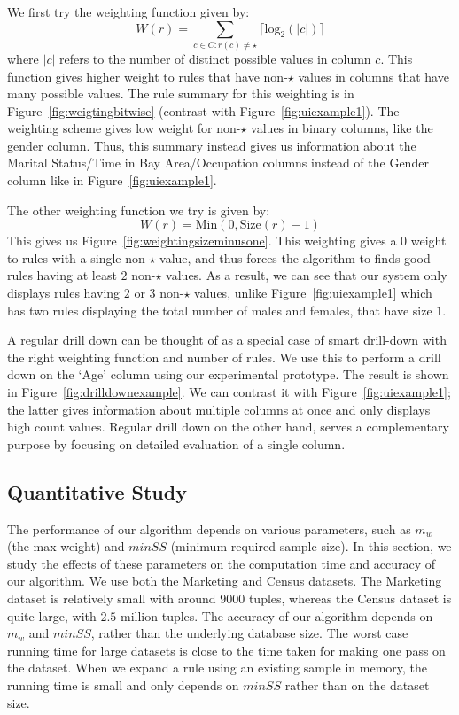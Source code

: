 We first try the weighting function given by:
$$W(r) = \sum_{c \in C : r(c) \neq \star} \lceil \text{log}_2(|c|) \rceil$$ where $|c|$ refers to the number of distinct possible values in column $c$. This function gives higher weight to rules that have non-$\star$ values in columns that have many possible values. The rule summary for this weighting is in Figure~\ref{fig:weigtingbitwise} (contrast with Figure~\ref{fig:uiexample1}). The weighting scheme gives low weight for non-$\star$ values in binary columns, like the gender column. Thus, this summary instead gives us information about the Marital Status/Time in Bay Area/Occupation columns instead of the Gender column like in Figure~\ref{fig:uiexample1}.  

The other weighting function we try is given by:
$$W(r) = \text{Min}(0, \text{Size}(r) - 1)$$
This gives us Figure~\ref{fig:weightingsizeminusone}. This weighting gives a $0$ weight to rules with a single non-$\star$ value, and thus forces the algorithm to finds good rules having at least $2$ non-$\star$ values. As a result, we can see that our system only displays rules having $2$ or $3$ non-$\star$ values, unlike Figure~\ref{fig:uiexample1} which has two rules displaying the total number of males and females, that have size $1$.

A regular drill down can be thought of as a special case of smart drill-down with the right weighting function and number of rules. We use this to perform a drill down on the `Age' column using our experimental prototype. The result is shown in Figure~\ref{fig:drilldownexample}. We can contrast it with Figure~\ref{fig:uiexample1}; the latter gives information about multiple columns at once and only displays high count values. Regular drill down on the other hand, serves a complementary purpose by focusing on detailed evaluation of a single column.




\vspace{-3pt}
\subsection{Quantitative Study}\label{sec:quantitative_study}
The performance of our algorithm depends on various parameters, such as $m_w$ (the max weight) and $minSS$ (minimum required sample size). In this section, we study the effects of these parameters on the computation time and accuracy of our algorithm. We use both the Marketing and Census datasets. The Marketing dataset is relatively small with around $9000$ tuples, whereas the Census dataset is quite large, with $2.5$ million tuples. The accuracy of our algorithm depends on $m_w$ and $minSS$, rather than the underlying database size. The worst case running time for large datasets is close to the time taken for making one pass on the dataset. When we expand a rule using an existing sample in memory, the running time is small and only depends on $minSS$ rather than on the dataset size.

